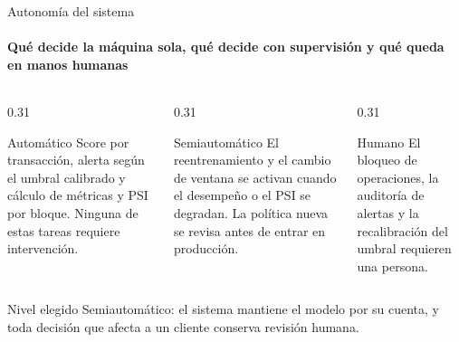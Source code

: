 \documentclass[aspectratio=169,11pt]{beamer}
\begin{document}
\begin{frame}{Autonomía del sistema}
  \framesubtitle{Qué decide la máquina sola, qué decide con supervisión y qué queda en manos humanas}
  \begin{columns}[T]
    \begin{column}{0.31\textwidth}
      \begin{block}{Automático}
        \small Score por transacción, alerta según el umbral calibrado y cálculo de métricas y PSI por bloque. Ninguna de estas tareas requiere intervención.
      \end{block}
    \end{column}
    \begin{column}{0.31\textwidth}
      \begin{block}{Semiautomático}
        \small El reentrenamiento y el cambio de ventana se activan cuando el desempeño o el PSI se degradan. La política nueva se revisa antes de entrar en producción.
      \end{block}
    \end{column}
    \begin{column}{0.31\textwidth}
      \begin{block}{Humano}
        \small El bloqueo de operaciones, la auditoría de alertas y la recalibración del umbral requieren una persona.
      \end{block}
    \end{column}
  \end{columns}
  \vspace{0.45em}
  \begin{alertblock}{Nivel elegido}
    \centering\small Semiautomático: el sistema mantiene el modelo por su cuenta, y toda decisión que afecta a un cliente conserva revisión humana.
  \end{alertblock}
\end{frame}
\end{document}

